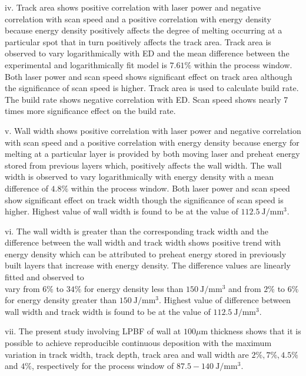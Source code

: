 \documentclass[10pt]{article}
\begin{document}
iv. Track area shows positive correlation with laser power and negative correlation with scan speed and a positive correlation with energy density because energy density positively affects the degree of melting occurring at a particular spot that in turn positively affects the track area. Track area is observed to vary logarithmically with ED and the mean difference between the experimental and logarithmically fit model is $7.61 \%$ within the process window. Both laser power and scan speed shows significant effect on track area although the significance of scan speed is higher. Track area is used to calculate build rate. The build rate shows negative correlation with ED. Scan speed shows nearly 7 times more significance effect on the build rate.

v. Wall width shows positive correlation with laser power and negative correlation with scan speed and a positive correlation with energy density because energy for melting at a particular layer is provided by both moving laser and preheat energy stored from previous layers which, positively affects the wall width. The wall width is observed to vary logarithmically with energy density with a mean difference of $4.8 \%$ within the process window. Both laser power and scan speed show significant effect on track width though the significance of scan speed is higher. Highest value of wall width is found to be at the value of $112.5 \mathrm{~J} / \mathrm{mm}^{3}$.

vi. The wall width is greater than the corresponding track width and the difference between the wall width and track width shows positive trend with energy density which can be attributed to preheat energy stored in previously built layers that increase with energy density. The difference values are linearly fitted and observed to\\
vary from $6 \%$ to $34 \%$ for energy density less than $150 \mathrm{~J} / \mathrm{mm}^{3}$ and from $2 \%$ to $6 \%$ for energy density greater than $150 \mathrm{~J} / \mathrm{mm}^{3}$. Highest value of difference between wall width and track width is found to be at the value of $112.5 \mathrm{~J} / \mathrm{mm}^{3}$.

vii. The present study involving LPBF of wall at $100 \mu \mathrm{m}$ thickness shows that it is possible to achieve reproducible continuous deposition with the maximum variation in track width, track depth, track area and wall width are $2 \%, 7 \%, 4.5 \%$ and $4 \%$, respectively for the process window of $87.5-140 \mathrm{~J} / \mathrm{mm}^{3}$.
\end{document}
